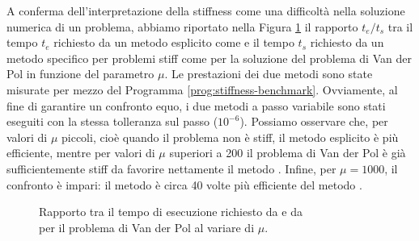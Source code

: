A conferma dell'interpretazione della stiffness come una difficoltà nella soluzione
numerica di un problema, abbiamo riportato nella Figura \ref{fig:van-der-pol-perfratio}
il rapporto $t_e/t_s$ tra il tempo $t_e$ richiesto da un metodo esplicito
come  e il tempo $t_s$ richiesto da un metodo specifico per problemi
stiff come  per la soluzione del problema di Van der Pol in
funzione del parametro $\mu$.
Le prestazioni dei due metodi sono state misurate per mezzo del
Programma \ref{prog:stiffness-benchmark}.
Ovviamente, al fine di garantire un confronto equo, i due metodi a passo
variabile sono stati eseguiti con la stessa tolleranza sul passo ($10^{-6}$).
Possiamo osservare che, per valori di $\mu$ piccoli, cioè quando il problema non è stiff,
il metodo esplicito è più efficiente, mentre per valori di $\mu$ superiori a 200
il problema di Van der Pol è già sufficientemente stiff da favorire
nettamente il metodo . Infine, per $\mu = 1000$, il confronto
è impari: il metodo  è circa 40 volte più efficiente del metodo .



\begin{figure}[tbp]
\centering
{}
\caption{Rapporto tra il tempo di esecuzione richiesto da 
e da \\ per il problema di Van der Pol al variare di $\mu$.}
\label{fig:van-der-pol-perfratio}
\end{figure}


























